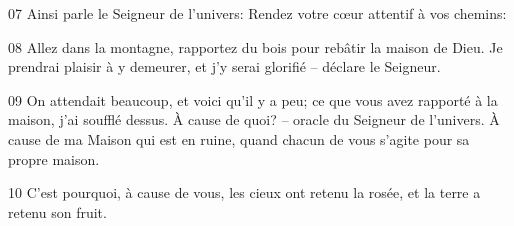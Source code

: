 
07 Ainsi parle le Seigneur de l’univers: Rendez votre cœur attentif à vos chemins:

08 Allez dans la montagne, rapportez du bois pour rebâtir la maison de Dieu. Je prendrai plaisir à y demeurer, et j’y serai glorifié – déclare le Seigneur.

09 On attendait beaucoup, et voici qu’il y a peu; ce que vous avez rapporté à la maison, j’ai soufflé dessus. À cause de quoi? – oracle du Seigneur de l’univers. À cause de ma Maison qui est en ruine, quand chacun de vous s’agite pour sa propre maison.

10 C’est pourquoi, à cause de vous, les cieux ont retenu la rosée, et la terre a retenu son fruit.